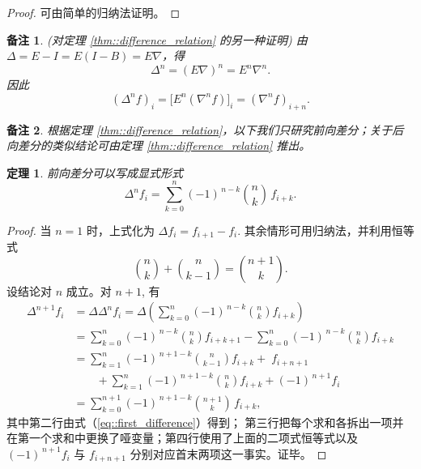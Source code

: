 \documentclass[a4paper]{ctexart}
\newtheorem{theorem}{定理}
\newtheorem{remark}{备注}
\numberwithin{theorem}{section}
\numberwithin{equation}{section}
\numberwithin{figure}{section}
\numberwithin{remark}{section}
\begin{document}
\begin{proof}
可由简单的归纳法证明。
\end{proof}

\begin{remark}
    (对定理 \ref{thm::difference_relation} 的另一种证明)
由 $\Delta=E-I=E(I-B)=E\nabla$，得
\begin{equation}
\Delta^{n}=(E\nabla)^{n}=E^{n}\nabla^{n}.
\end{equation}
因此
\begin{equation}
(\Delta^{n}f)_i=\bigl[E^{n}(\nabla^{n}f)\bigr]_i=(\nabla^{n}f)_{i+n}.
\end{equation}
\end{remark}

\begin{remark}
根据定理 \ref{thm::difference_relation}，以下我们只研究前向差分；关于后向差分的类似结论可由定理 \ref{thm::difference_relation} 推出。
\end{remark}

\begin{theorem}
    \label{thm::difference_explicit}
前向差分可以写成显式形式
\begin{equation}
\Delta^{n} f_i=\sum_{k=0}^{n}(-1)^{\,n-k}\binom{n}{k}\,f_{i+k}.
\end{equation}
\end{theorem}

\begin{proof}
当 $n=1$ 时，上式化为 $\Delta f_i=f_{i+1}-f_i$. 其余情形可用归纳法，并利用恒等式
\begin{equation}
\binom{n}{k}+\binom{n}{k-1}=\binom{n+1}{k}.
\end{equation}
设结论对 $n$ 成立。对 $n+1$, 有
\begin{align*}
\Delta^{n+1}f_i
&=\Delta\Delta^{n}f_i
=\Delta\!\left(\sum_{k=0}^{n}(-1)^{\,n-k}\binom{n}{k}f_{i+k}\right)\\
&=\sum_{k=0}^{n}(-1)^{\,n-k}\binom{n}{k}f_{i+k+1}
-\sum_{k=0}^{n}(-1)^{\,n-k}\binom{n}{k}f_{i+k}\\
&=\sum_{k=1}^{n}(-1)^{\,n+1-k}\binom{n}{k-1}f_{i+k}
+\;f_{i+n+1}\\
&\qquad+\sum_{k=1}^{n}(-1)^{\,n+1-k}\binom{n}{k}f_{i+k}
+(-1)^{\,n+1}f_i\\
&=\sum_{k=0}^{n+1}(-1)^{\,n+1-k}\binom{n+1}{k}\,f_{i+k},
\end{align*}
其中第二行由式（\ref{eq::first_difference}）得到；
第三行把每个求和各拆出一项并在第一个求和中更换了哑变量；第四行使用了上面的二项式恒等式以及 $(-1)^{\,n+1}f_i$ 与 $f_{i+n+1}$ 
分别对应首末两项这一事实。证毕。
\end{proof}
\end{document}
